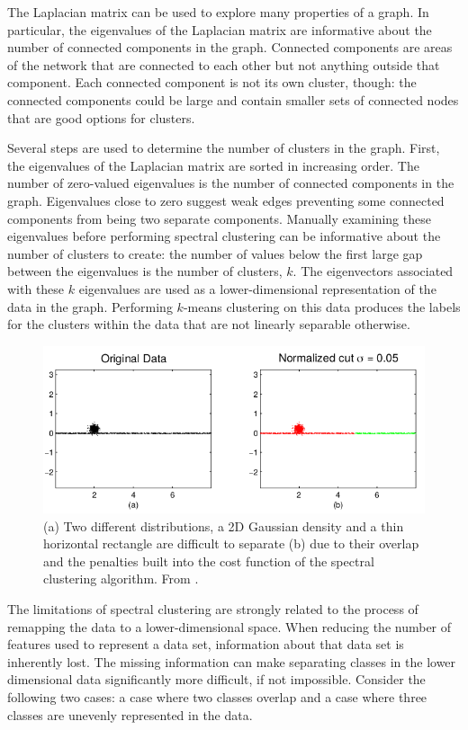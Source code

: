 The Laplacian matrix can be used to explore many properties of a graph. In particular, the eigenvalues of the Laplacian matrix are informative about the number of connected components in the graph. Connected components are areas of the network that are connected to each other but not anything outside that component. Each connected component is not its own cluster, though: the connected components could be large and contain smaller sets of connected nodes that are good options for clusters.

Several steps are used to determine the number of clusters in the graph. First, the eigenvalues of the Laplacian matrix are sorted in increasing order. The number of zero-valued eigenvalues is the number of connected components in the graph. Eigenvalues close to zero suggest weak edges preventing some connected components from being two separate components. Manually examining these eigenvalues before performing spectral clustering can be informative about the number of clusters to create: the number of values below the first large gap between the eigenvalues is the number of clusters, $k$. The eigenvectors associated with these $k$ eigenvalues are used as a lower-dimensional representation of the data in the graph. Performing $k$-means clustering on this data produces the labels for the clusters within the data that are not linearly separable otherwise.

\begin{figure}
\includegraphics[width=.75\textwidth]{4/spectral_clustering_limitation.png}
\caption{(a) Two different distributions, a 2D Gaussian density and a thin horizontal rectangle are difficult to separate (b) due to their overlap and the penalties built into the cost function of the spectral clustering algorithm. From \cite{Nadler2007}.}
\label{ch4:fig:spect-clust-lim-01}
\end{figure}

The limitations of spectral clustering are strongly related to the process of remapping the data to a lower-dimensional space.  When reducing the number of features used to represent a data set, information about that data set is inherently lost. The missing information can make separating classes in the lower dimensional data significantly more difficult, if not impossible. Consider the following two cases: a case where two classes overlap and a case where three classes are unevenly represented in the data.

